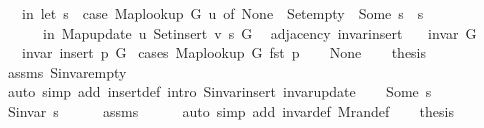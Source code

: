 \begin{isabellebody}
\ \ \ in\ let\ s\ {\isacharequal}{\kern0pt}\ case\ Map{\isacharunderscore}{\kern0pt}lookup\ G\ u\ of\ None\ {\isasymRightarrow}\ Set{\isacharunderscore}{\kern0pt}empty\ {\isacharbar}{\kern0pt}\ Some\ s{\isacharprime}{\kern0pt}\ {\isasymRightarrow}\ s{\isacharprime}{\kern0pt}\isanewline
\ \ \ \ \ \ in\ Map{\isacharunderscore}{\kern0pt}update\ u\ {\isacharparenleft}{\kern0pt}Set{\isacharunderscore}{\kern0pt}insert\ v\ s{\isacharparenright}{\kern0pt}\ G{\isachardoublequoteclose}\isanewline
\isanewline
{}\isamarkupfalse%
\ {\isacharparenleft}{\kern0pt}\ adjacency{\isacharparenright}{\kern0pt}\ invar{\isacharunderscore}{\kern0pt}insert{\isacharcolon}{\kern0pt}\isanewline
\ \ \ {\isachardoublequoteopen}invar\ G{\isachardoublequoteclose}\isanewline
\ \ \ {\isachardoublequoteopen}invar\ {\isacharparenleft}{\kern0pt}insert\ p\ G{\isacharparenright}{\kern0pt}{\isachardoublequoteclose}\isanewline
%
\isadelimproof
%
\endisadelimproof
%
\isatagproof
{}\isamarkupfalse%
\ {\isacharparenleft}{\kern0pt}cases\ {\isachardoublequoteopen}Map{\isacharunderscore}{\kern0pt}lookup\ G\ {\isacharparenleft}{\kern0pt}fst\ p{\isacharparenright}{\kern0pt}{\isachardoublequoteclose}{\isacharparenright}{\kern0pt}\isanewline
\ \ \isamarkupfalse%
\ None\isanewline
\ \ \isamarkupfalse%
\ {\isacharquery}{\kern0pt}thesis\isanewline
\ \ \ \ \isamarkupfalse%
\ assms\ S{\isachardot}{\kern0pt}invar{\isacharunderscore}{\kern0pt}empty\isanewline
\ \ \ \ \isamarkupfalse%
\ {\isacharparenleft}{\kern0pt}auto\ simp\ add{\isacharcolon}{\kern0pt}\ insert{\isacharunderscore}{\kern0pt}def\ intro{\isacharcolon}{\kern0pt}\ S{\isachardot}{\kern0pt}invar{\isacharunderscore}{\kern0pt}insert\ invar{\isacharunderscore}{\kern0pt}update{\isacharparenright}{\kern0pt}\isanewline
{}\isamarkupfalse%
\isanewline
\ \ \isamarkupfalse%
\ {\isacharparenleft}{\kern0pt}Some\ s{\isacharparenright}{\kern0pt}\isanewline
\ \ \isamarkupfalse%
\ {\isachardoublequoteopen}S{\isachardot}{\kern0pt}invar\ s{\isachardoublequoteclose}\isanewline
\ \ \ \ \isamarkupfalse%
\ assms\isanewline
\ \ \ \ \isamarkupfalse%
\ {\isacharparenleft}{\kern0pt}auto\ simp\ add{\isacharcolon}{\kern0pt}\ invar{\isacharunderscore}{\kern0pt}def\ M{\isachardot}{\kern0pt}ran{\isacharunderscore}{\kern0pt}def{\isacharparenright}{\kern0pt}\isanewline
\ \ \isamarkupfalse%
\ {\isacharquery}{\kern0pt}thesis\isanewline
\ \ \ \ \isamarkupfalse%

\end{isabellebody}
